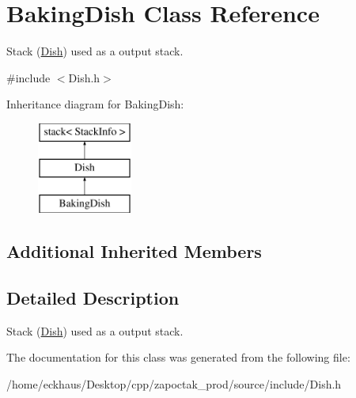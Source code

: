\hypertarget{classBakingDish}{\section{Baking\-Dish Class Reference}
\label{classBakingDish}
}


Stack (\hyperlink{classDish}{Dish}) used as a output stack.  




{\ttfamily \#include $<$Dish.\-h$>$}

Inheritance diagram for Baking\-Dish\-:\begin{figure}[H]
\begin{center}
\leavevmode
\includegraphics[height=3.000000cm]{classBakingDish}
\end{center}
\end{figure}
\subsection*{Additional Inherited Members}


\subsection{Detailed Description}
Stack (\hyperlink{classDish}{Dish}) used as a output stack. 

The documentation for this class was generated from the following file\-:\begin{DoxyCompactItemize}
\item 
/home/eckhaus/\-Desktop/cpp/zapoctak\-\_\-prod/source/include/Dish.\-h\end{DoxyCompactItemize}

